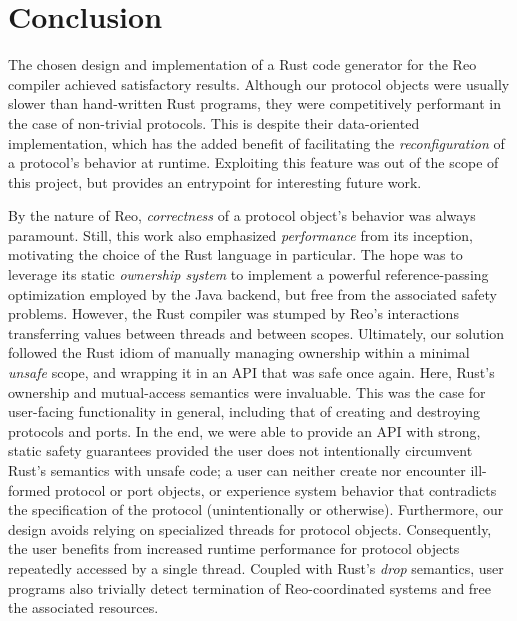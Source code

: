 \section{Conclusion}

The chosen design and implementation of a Rust code generator for the Reo compiler achieved satisfactory results. Although our protocol objects were usually slower than hand-written Rust programs, they were competitively performant in the case of non-trivial protocols. This is despite their data-oriented implementation, which has the added benefit of facilitating the \textit{reconfiguration} of a protocol's behavior at runtime. Exploiting this feature was out of the scope of this project, but provides an entrypoint for interesting future work.

By the nature of Reo, \textit{correctness} of a protocol object's behavior was always paramount. Still, this work also emphasized \textit{performance} from its inception, motivating the choice of the Rust language in particular. The hope was to leverage its static \textit{ownership system} to implement a powerful reference-passing optimization employed by the Java backend, but free from the associated safety problems. However, the Rust compiler was stumped by Reo's interactions transferring values between threads and between scopes. Ultimately, our solution followed the Rust idiom of manually managing ownership within a minimal \textit{unsafe} scope, and wrapping it in an API that was safe once again. Here, Rust's ownership and mutual-access semantics were invaluable. This was the case for user-facing functionality in general, including that of creating and destroying protocols and ports. In the end, we were able to provide an API with strong, static safety guarantees provided the user does not intentionally circumvent Rust's semantics with unsafe code; a user can neither create nor encounter ill-formed protocol or port objects, or experience system behavior that contradicts the specification of the protocol (unintentionally or otherwise). Furthermore, our design avoids relying on specialized threads for protocol objects. Consequently, the user benefits from increased runtime performance for protocol objects repeatedly accessed by a single thread. Coupled with Rust's \textit{drop} semantics, user programs also trivially detect termination of Reo-coordinated systems and free the associated resources.

